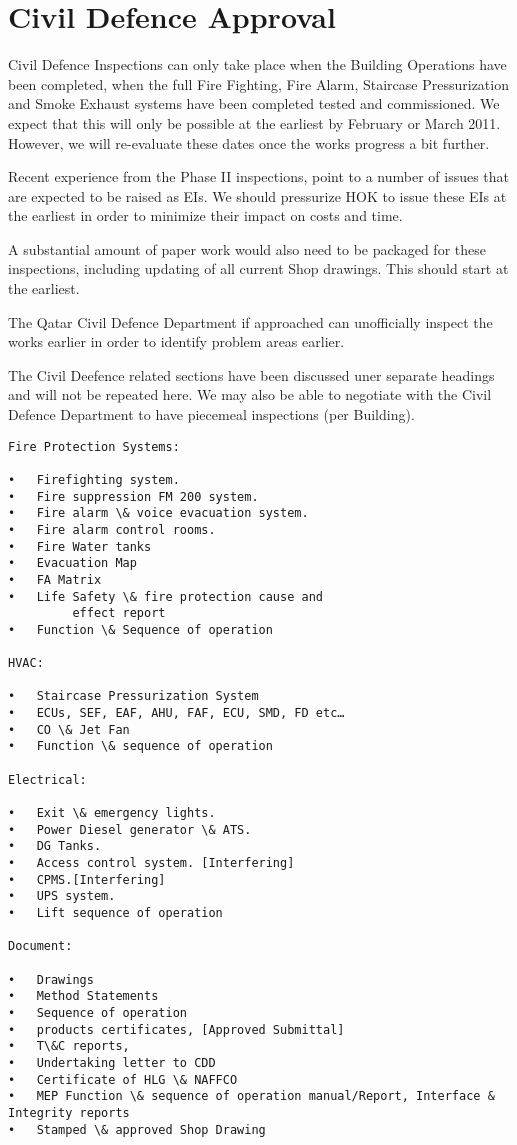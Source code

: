 \chapter{Civil Defence Approval}

Civil Defence Inspections can only take place when the Building Operations have been completed, when the full Fire Fighting,  Fire Alarm, Staircase Pressurization and Smoke Exhaust systems have been completed tested and commissioned. We expect that this will only be possible at the earliest by February or March  2011. However, we will re-evaluate these dates once the works progress a bit further. 

Recent experience from the Phase II inspections, point to a number of issues that are expected to be raised as EIs. We should pressurize HOK to issue these EIs at the earliest in order to minimize their impact on costs and time.

A substantial amount of paper work would also need to be packaged for these inspections, including updating of all current Shop drawings. This should start at the earliest. 

The Qatar Civil Defence Department if approached can unofficially inspect the works earlier in order to identify problem areas earlier.

The Civil Deefence related sections have been discussed uner separate headings and will not be repeated here. We may also be able to negotiate with the Civil Defence Department to have  piecemeal inspections (per Building).

\begin{verbatim}
Fire Protection Systems: 

•	Firefighting system.
•	Fire suppression FM 200 system.
•	Fire alarm \& voice evacuation system.
•	Fire alarm control rooms.
•	Fire Water tanks
•	Evacuation Map
•	FA Matrix
•	Life Safety \& fire protection cause and 
         effect report
•	Function \& Sequence of operation

HVAC:

•	Staircase Pressurization System 
•	ECUs, SEF, EAF, AHU, FAF, ECU, SMD, FD etc…
•	CO \& Jet Fan
•	Function \& sequence of operation

Electrical:

•	Exit \& emergency lights.            
•	Power Diesel generator \& ATS.
•	DG Tanks.
•	Access control system. [Interfering]
•	CPMS.[Interfering]
•	UPS system.
•	Lift sequence of operation 

Document:

•	Drawings
•	Method Statements
•	Sequence of operation 
•	products certificates, [Approved Submittal]
•	T\&C reports, 
•	Undertaking letter to CDD
•	Certificate of HLG \& NAFFCO
•	MEP Function \& sequence of operation manual/Report, Interface & Integrity reports
•	Stamped \& approved Shop Drawing
\end{verbatim}



